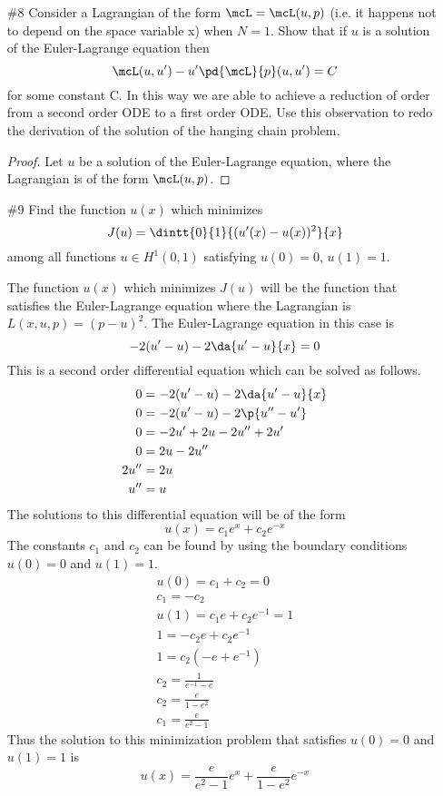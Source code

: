 \documentclass[11pt, oneside]{article}
\begin{document}
\begin{enumerate}
  \pagebreak
  \item[\#8]
    Consider a Lagrangian of the form $\mcL = \mcL(u, p)$ (i.e. it happens not
    to depend on the space variable x) when $N = 1$.
    Show that if $u$ is a solution of the Euler-Lagrange equation then
    \[
      \mcL(u, u') - u' \pd{\mcL}{p}(u, u') = C
    \]
    for some constant C.
    In this way we are able to achieve a reduction of order from a second order
    ODE to a first order ODE.
    Use this observation to redo the derivation of the solution of the hanging
    chain problem.

    \begin{proof}
      Let $u$ be a solution of the Euler-Lagrange equation, where the Lagrangian
      is of the form $\mcL(u, p)$.
    \end{proof}

  \pagebreak
  \item[\#9] %
    Find the function $u(x)$ which minimizes
    \[
      J(u) = \dintt{0}{1}{(u'(x) - u(x))^2}{x}
    \]
    among all functions $u \in H^1(0, 1)$ satisfying $u(0) = 0$, $u(1) = 1$.

    The function $u(x)$ which minimizes $J(u)$ will be the function that
    satisfies the Euler-Lagrange equation where the Lagrangian is
    $L(x, u, p) = (p - u)^2$.
    The Euler-Lagrange equation in this case is
    \[
      -2(u' - u) - 2\da{u' - u}{x} = 0
    \]
    This is a second order differential equation which can be solved as follows.
    \begin{align*}
      0 &= -2(u' - u) - 2\da{u' - u}{x} \\
      0 &= -2(u' - u) - 2\p{u'' - u'} \\
      0 &= -2u' + 2u - 2u'' + 2u' \\
      0 &= 2u - 2u'' \\
      2u'' &= 2u \\
      u'' &= u \\
    \end{align*}
    The solutions to this differential equation will be of the form
    \[
      u(x) = c_1 e^x + c_2 e^{-x}
    \]
    The constants $c_1$ and $c_2$ can be found by using the boundary conditions
    $u(0) = 0$ and $u(1) = 1$.
    \begin{align*}
      u(0) = c_1 + c_2 = 0 \\
      c_1 = -c_2 \\
      u(1) = c_1 e + c_2 e^{-1} = 1\\
      1 = -c_2 e + c_2 e^{-1} \\
      1 = c_2(-e + e^{-1}) \\
      c_2 = \frac{1}{e^{-1} - e} \\
      c_2 = \frac{e}{1 - e^2} \\
      c_1 = \frac{e}{e^2 - 1}
    \end{align*}
    Thus the solution to this minimization problem that satisfies $u(0) = 0$ and
    $u(1) = 1$ is
    \[
      u(x) = \frac{e}{e^2 - 1} e^x + \frac{e}{1 - e^2} e^{-x}
    \]


\end{enumerate}
\end{document}
